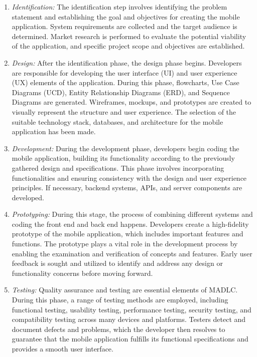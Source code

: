 \begin{enumerate}[1.]
    \item \textit{Identification:} The identification step involves identifying the problem statement and establishing the goal and objectives for creating the mobile application. System requirements are collected and the target audience is determined. Market research is performed to evaluate the potential viability of the application, and specific project scope and objectives are established.
    \item \textit{Design:} After the identification phase, the design phase begins. Developers are responsible for developing the user interface (UI) and user experience (UX) elements of the application. During this phase, flowcharts, Use Case Diagrams (UCD), Entity Relationship Diagrams (ERD), and Sequence Diagrams are generated. Wireframes, mockups, and prototypes are created to visually represent the structure and user experience. The selection of the suitable technology stack, databases, and architecture for the mobile application has been made.
    \item \textit{Development:} During the development phase, developers begin coding the mobile application, building its functionality according to the previously gathered design and specifications. This phase involves incorporating functionalities and ensuring consistency with the design and user experience principles. If necessary, backend systems, APIs, and server components are developed.
    \item \textit{Prototyping:} During this stage, the process of combining different systems and coding the front end and back end happens. Developers create a high-fidelity prototype of the mobile application, which includes important features and functions. The prototype plays a vital role in the development process by enabling the examination and verification of concepts and features. Early user feedback is sought and utilized to identify and address any design or functionality concerns before moving forward.
    \item \textit{Testing:} Quality assurance and testing are essential elements of MADLC. During this phase, a range of testing methods are employed, including functional testing, usability testing, performance testing, security testing, and compatibility testing across many devices and platforms. Testers detect and document defects and problems, which the developer then resolves to guarantee that the mobile application fulfills its functional specifications and provides a smooth user interface.
\end{enumerate}

